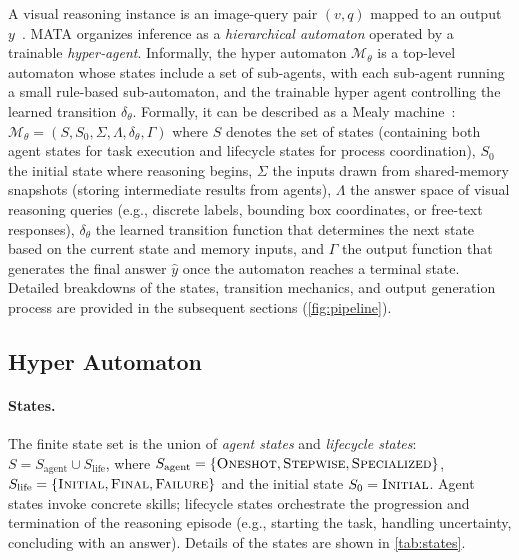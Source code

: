 \documentclass{article} %
\newcommand{\methodname}{MATA}
\begin{document}
A visual reasoning instance is an image-query pair $(v,q)$ mapped to an output $y$~\citep{ke_explain_2025}. \methodname{} organizes inference as a \emph{hierarchical automaton} operated by a trainable \emph{hyper‑agent}. Informally, the hyper automaton $\mathcal{M}_\theta$ is a top-level automaton whose states include a set of sub-agents, with each sub-agent running a small rule-based sub-automaton, and the trainable hyper agent controlling the learned transition $\delta_\theta$. Formally, it can be described as a Mealy machine~\citep{mealy_method_1955}: $\mathcal{M}_\theta = (S, S_0, \Sigma, \Lambda, \delta_\theta, \Gamma)$ where $S$ denotes the set of states (containing both agent states for task execution and lifecycle states for process coordination), $S_0$ the initial state where reasoning begins, $\Sigma$ the inputs drawn from shared-memory snapshots (storing intermediate results from agents), $\Lambda$ the answer space of visual reasoning queries (e.g., discrete labels, bounding box coordinates, or free-text responses), $\delta_\theta$ the learned transition function that determines the next state based on the current state and memory inputs, and $\Gamma$  the output function that generates the final answer $\hat y$ once the automaton reaches a terminal state. Detailed breakdowns of the states, transition mechanics, and output generation process are provided in the subsequent sections (\autoref{fig:pipeline}).


\subsection{Hyper Automaton} \label{sec:hyper_automaton}

\paragraph{States.} The finite state set is the union of \emph{agent states} and \emph{lifecycle states}: $S = S_\text{agent} \cup S_\text{life}$, where $S_\text{agent} = \{ \textsc{Oneshot}, \textsc{Stepwise}, \textsc{Specialized}\}$, $S_\text{life} = \{\textsc{Initial}, \textsc{Final}, \textsc{Failure}\}$ and the initial state $S_0 = \textsc{Initial}$. Agent states invoke concrete skills; lifecycle states orchestrate the progression and termination of the reasoning episode (e.g., starting the task, handling uncertainty, concluding with an answer). Details of the states are shown in \autoref{tab:states}.
\end{document}
